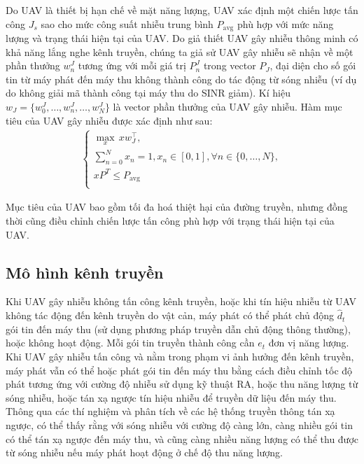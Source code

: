 \documentclass{uetgraduation}
\begin{document}
Do UAV là thiết bị hạn chế về mặt năng lượng, UAV xác định một chiến lược tấn công $J_s$ sao cho mức công suất nhiễu trung bình $P_\text{avg}$ phù hợp với mức năng lượng và trạng thái hiện tại của UAV.
Do giả thiết UAV gây nhiễu thông minh có khả năng lắng nghe kênh truyền, chúng ta giả sử UAV gây nhiễu sẽ nhận về một phần thưởng $w_n^J$ tương ứng với mỗi giá trị $P_n^J$ trong vector $P_J$, đại diện
cho số gói tin từ máy phát đến máy thu không thành công do tác động từ sóng nhiễu (ví dụ do không giải mã thành công tại máy thu do SINR giảm). Kí hiệu $w_J = \{w_0^J, \dots, w_n^J, \dots, w_N^J\}$
là vector phần thưởng của UAV gây nhiễu. Hàm mục tiêu của UAV gây nhiễu được xác định như sau:
\begin{equation}
    \begin{split}
        \begin{cases}
            \underset{x}{\max} \, x w_J^\top, \\
            \sum_{n=0}^{N} x_n = 1, x_n \in [0, 1], \forall n \in \{0, \dots, N\}, \\
            x P^T \leq P_\text{avg} \\
        \end{cases}
    \end{split}
\end{equation}

Mục tiêu của UAV bao gồm tối đa hoá thiệt hại của đường truyền, nhưng đồng thời cũng điều chỉnh chiến lược tấn công phù hợp với trạng thái hiện tại của UAV.

\subsection{Mô hình kênh truyền}
Khi UAV gây nhiễu không tấn công kênh truyền, hoặc khi tín hiệu nhiễu từ UAV không tác động đến kênh truyền do vật cản, máy phát có thể phát chủ động $\hat{d}_t$
gói tin đến máy thu (sử dụng phương pháp truyền dẫn chủ động thông thường), hoặc không hoạt động. Mỗi gói tin truyền thành công cần $e_t$ đơn vị năng lượng.
Khi UAV gây nhiễu tấn công và nằm trong phạm vi ảnh hưởng đến kênh truyền, máy phát vẫn có thể hoặc phát gói tin đến máy thu bằng cách điều chỉnh tốc độ phát tương
ứng với cường độ nhiễu sử dụng kỹ thuật RA, hoặc thu năng lượng từ sóng nhiễu, hoặc tán xạ ngược tín hiệu nhiễu để truyền dữ liệu đến máy thu. Thông qua các thí nghiệm
và phân tích về các hệ thống truyền thông tán xạ ngược, có thể thấy rằng với sóng nhiễu với cường độ càng lớn, càng nhiều gói tin có thể tán xạ ngược đến máy thu, và cũng
càng nhiều năng lượng có thể thu được từ sóng nhiễu nếu máy phát hoạt động ở chế độ thu năng lượng. 
\end{document}
